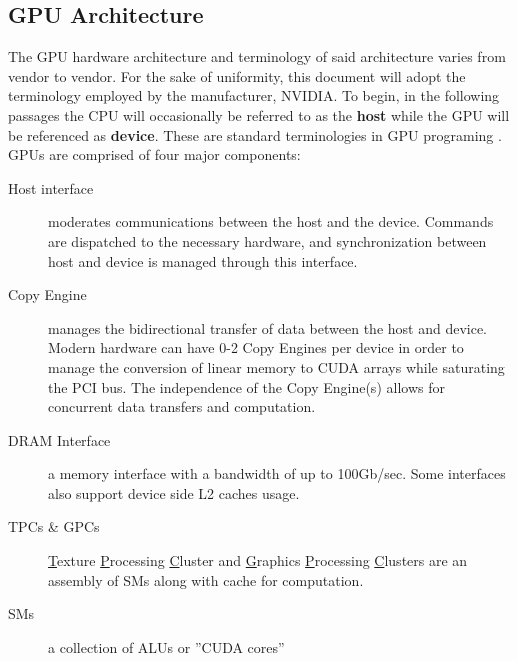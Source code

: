 \subsection{GPU Architecture}\label{ssec:gpu_architecture}
The GPU hardware architecture and terminology of said architecture varies from
vendor to vendor.  For the sake of uniformity, this document will adopt the
terminology employed by the manufacturer, NVIDIA.  To begin, in the following passages the CPU
will occasionally be referred to as the \textbf{host} while the GPU will be referenced as \textbf{device}.
These are standard terminologies in GPU programing \cite{Wilt}. GPUs are comprised of four major components:
\begin{description}
  \item[Host interface] moderates communications between the host and the device.
  Commands are dispatched to the necessary hardware, and synchronization between
  host and device is managed through this interface.
  \item[Copy Engine] manages the bidirectional transfer of data between the host
  and device.  Modern hardware can have 0-2 Copy Engines per device in order to
  manage the conversion of linear memory to CUDA arrays while saturating the PCI
  bus.  The independence of the Copy Engine(s) allows for concurrent data transfers
  and computation.
  \item[DRAM Interface] a memory interface with a bandwidth of up to 100Gb/sec\cite{Wilt}.
  Some interfaces also support device side L2 caches usage.
  \item[TPCs \& GPCs] \underline{T}exture \underline{P}rocessing \underline{C}luster
  and \underline{G}raphics \underline{P}rocessing \underline{C}lusters are an assembly
  of \Glspl{SM} along with cache for computation.
  \item[\Glspl{SM}] a collection of \Glspl{ALU} or ''CUDA cores''
\end{description}

